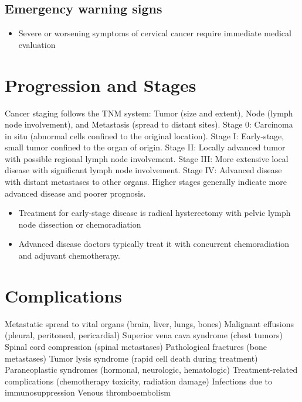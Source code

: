 \subsection{Emergency warning signs}
\begin{itemize}[noitemsep]
  \item Severe or worsening symptoms of cervical cancer require immediate medical evaluation
\end{itemize}
\section{Progression and Stages}
Cancer staging follows the TNM system: Tumor (size and extent), Node (lymph node involvement), and Metastasis (spread to distant sites). Stage 0: Carcinoma in situ (abnormal cells confined to the original location). Stage I: Early-stage, small tumor confined to the organ of origin. Stage II: Locally advanced tumor with possible regional lymph node involvement. Stage III: More extensive local disease with significant lymph node involvement. Stage IV: Advanced disease with distant metastases to other organs. Higher stages generally indicate more advanced disease and poorer prognosis.

\begin{itemize}[noitemsep]
  \item Treatment for early-stage disease is radical hysterectomy with pelvic lymph node dissection or chemoradiation
  \item Advanced disease doctors typically treat it with concurrent chemoradiation and adjuvant chemotherapy.
\end{itemize}
\section{Complications}
Metastatic spread to vital organs (brain, liver, lungs, bones) Malignant effusions (pleural, peritoneal, pericardial) Superior vena cava syndrome (chest tumors) Spinal cord compression (spinal metastases) Pathological fractures (bone metastases) Tumor lysis syndrome (rapid cell death during treatment) Paraneoplastic syndromes (hormonal, neurologic, hematologic) Treatment-related complications (chemotherapy toxicity, radiation damage) Infections due to immunosuppression Venous thromboembolism

